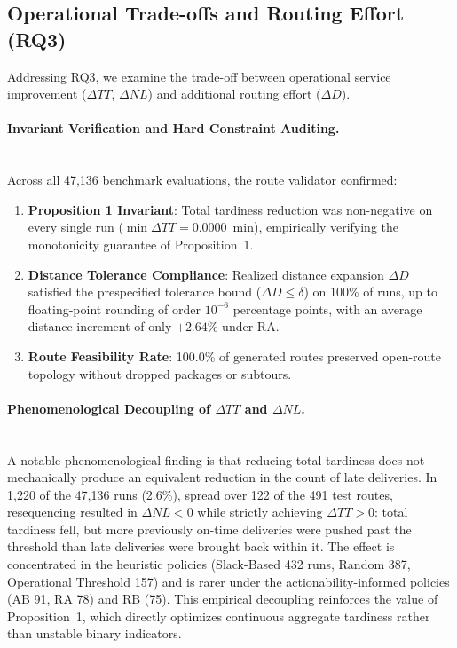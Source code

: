 \documentclass[11pt,a4paper]{article}
\begin{document}
\subsection{Operational Trade-offs and Routing Effort (RQ3)}\label{sec:res-rq3}

Addressing RQ3, we examine the trade-off between operational service improvement ($\Delta TT$, $\Delta NL$) and additional routing effort ($\Delta D$).

\paragraph{Invariant Verification and Hard Constraint Auditing.}\mbox{}\\
Across all 47,136 benchmark evaluations, the route validator confirmed:
\begin{enumerate}
    \item \textbf{Proposition 1 Invariant}: Total tardiness reduction was non-negative on every single run ($\min \Delta TT = 0.0000$~min), empirically verifying the monotonicity guarantee of Proposition~1.
    \item \textbf{Distance Tolerance Compliance}: Realized distance expansion $\Delta D$ satisfied the prespecified tolerance bound ($\Delta D \le \delta$) on 100\% of runs, up to floating-point rounding of order $10^{-6}$ percentage points, with an average distance increment of only $+2.64\%$ under RA.
    \item \textbf{Route Feasibility Rate}: 100.0\% of generated routes preserved open-route topology without dropped packages or subtours.
\end{enumerate}

\paragraph{Phenomenological Decoupling of $\Delta TT$ and $\Delta NL$.}\mbox{}\\
A notable phenomenological finding is that reducing total tardiness does not mechanically produce an equivalent reduction in the count of late deliveries. In 1,220 of the 47,136 runs (2.6\%), spread over 122 of the 491 test routes, resequencing resulted in $\Delta NL < 0$ while strictly achieving $\Delta TT > 0$: total tardiness fell, but more previously on-time deliveries were pushed past the threshold than late deliveries were brought back within it. The effect is concentrated in the heuristic policies (Slack-Based 432 runs, Random 387, Operational Threshold 157) and is rarer under the actionability-informed policies (AB 91, RA 78) and RB (75). This empirical decoupling reinforces the value of Proposition~1, which directly optimizes continuous aggregate tardiness rather than unstable binary indicators.
\end{document}
